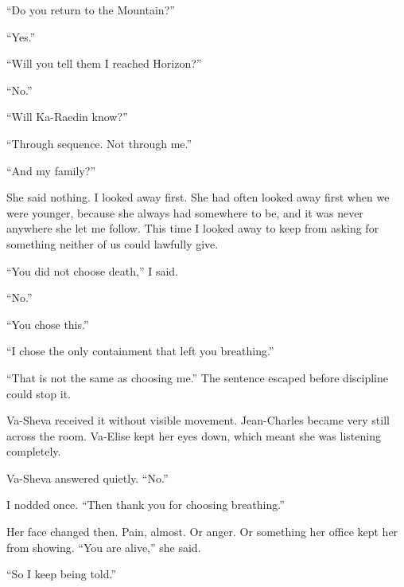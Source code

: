 ``Do you return to the Mountain?''\par

``Yes.''\par

``Will you tell them I reached Horizon?''\par

``No.''\par

``Will Ka-Raedin know?''\par

``Through sequence. Not through me.''\par

``And my family?''\par

She said nothing. I looked away first. She had often looked away first when we were younger, because she always had somewhere to be, and it was never anywhere she let me follow. This time I looked away to keep from asking for something neither of us could lawfully give.\par

``You did not choose death,'' I said.\par

``No.''\par

``You chose this.''\par

``I chose the only containment that left you breathing.''\par

``That is not the same as choosing me.'' The sentence escaped before discipline could stop it.\par

Va-Sheva received it without visible movement. Jean-Charles became very still across the room. Va-Elise kept her eyes down, which meant she was listening completely.\par

Va-Sheva answered quietly. ``No.''\par

I nodded once. ``Then thank you for choosing breathing.''\par

Her face changed then. Pain, almost. Or anger. Or something her office kept her from showing. ``You are alive,'' she said.\par

``So I keep being told.''\par

